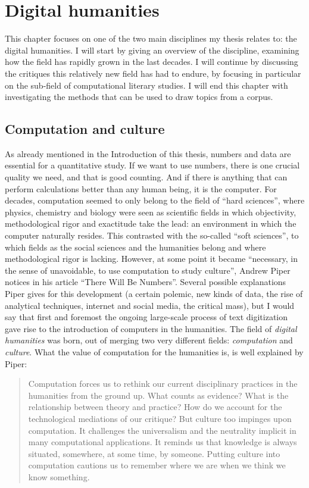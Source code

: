 \chapter{Digital humanities}
This chapter focuses on one of the two main disciplines my thesis relates to: the digital humanities. I will start by giving an overview of the discipline, examining how the field has rapidly grown in the last decades. I will continue by discussing the critiques this relatively new field has had to endure, by focusing in particular on the sub-field of computational literary studies. I will end this chapter with investigating the methods that can be used to draw topics from a corpus.

\section{Computation and culture}
As already mentioned in the Introduction of this thesis, numbers and data are essential for a quantitative study. If we want to use numbers, there is one crucial quality we need, and that is good counting. And if there is anything that can perform calculations better than any human being, it is the computer. For decades, computation seemed to only belong to the field of \enquote{hard sciences}, where physics, chemistry and biology were seen as scientific fields in which objectivity, methodological rigor and exactitude take the lead: an environment in which the computer naturally resides. This contrasted with the so-called \enquote{soft sciences}, to which fields as the social sciences and the humanities belong and where methodological rigor is lacking. However, at some point it became \enquote{necessary, in the sense of unavoidable, to use computation to study culture}, Andrew Piper notices in his article \enquote{There Will Be Numbers}.\autocite[1]{piper_there_2016} Several possible explanations Piper gives for this development (a certain polemic, new kinds of data, the rise of analytical techniques, internet and social media, the critical mass), but I would say that first and foremost the ongoing large-scale process of text digitization gave rise to the introduction of computers in the humanities. The field of \textit{digital humanities} was born, out of merging two very different fields: \textit{computation} and \textit{culture}.\autocite[2]{piper_there_2016} What the value of computation for the humanities is, is well explained by Piper:
\begin{quote}
	Computation forces us to rethink our current disciplinary practices in the humanities from the ground up. What counts as evidence? What is the relationship between theory and practice? How do we account for the technological mediations of our critique? But culture too impinges upon computation. It challenges the universalism and the neutrality implicit in many computational applications. It reminds us that knowledge is always situated, somewhere, at some time, by someone. Putting culture into computation cautions us to remember where we are when we think we know something.\autocite[2]{piper_there_2016}
\end{quote}

